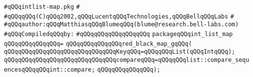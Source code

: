 \label{src/app/c-glue-maker/intlist-map.pkg}
\verb|#qQQqintlist-map.pkg|\newline
\verb|#|\newline
\verb|#qQQqqQQq(C)qQQq2002,qQQqLucentqQQqTechnologies,qQQqBellqQQqLabs|\newline
\verb|#|\newline
\verb|#qQQqauthor:qQQqMatthiasqQQqBlumeqQQq(blume@research.bell-labs.com)|\newline
\newline
\verb|#qQQqCompiledqQQqby:|\newline
\verb|#qQQqqQQqqQQqqQQqqQQq|\newline
\newline
\verb|packageqQQqint_list_map|\newline
\verb|qQQqqQQqqQQqqQQq=|\newline
\verb|qQQqqQQqqQQqqQQqred_black_map_gqQQq(|\newline
\newline
\verb|qQQqqQQqqQQqqQQqqQQqqQQqqQQqqQQqKeyqQQq=qQQqqQQqList(qQQqIntqQQq);|\newline
\verb|qQQqqQQqqQQqqQQqqQQqqQQqqQQqqQQqcompareqQQq=qQQqqQQqlist::compare_sequencesqQQqqQQqint::compare;|\newline
\verb|qQQqqQQqqQQqqQQq);|\newline

